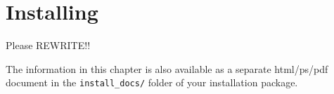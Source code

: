 \chapter{Installing \MCS}
\label{installing}

Please REWRITE!!

The information in this chapter is also available as a separate
html/ps/pdf document in the \texttt{install\_docs/} folder of your
\MCS installation package.

